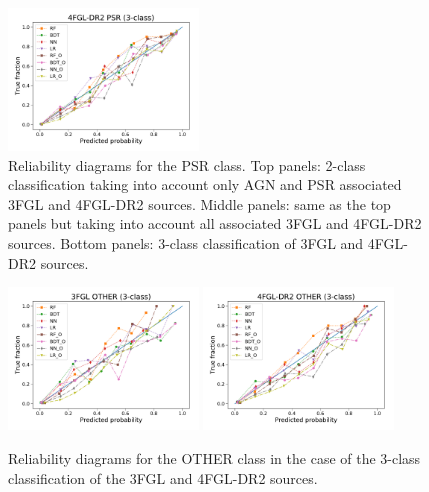 \documentclass{aa}
\begin{document}
\begin{appendix}
\begin{figure}[h!t]
\includegraphics[width=0.45\textwidth]{plots/reliability/calibration_PSR_4FGL-DR2_3classes.pdf}
\caption{Reliability diagrams for the PSR class. Top panels: 2-class classification 
taking into account only AGN and PSR associated 3FGL and 4FGL-DR2 sources.
Middle panels: same as the top panels but taking into account all associated 3FGL and 4FGL-DR2 sources.
Bottom panels: 3-class classification of 3FGL and 4FGL-DR2 sources.
}
\label{fig:rel_PSR}
\end{figure}


\begin{figure}[ht]
\centering
\includegraphics[width=0.45\textwidth]{plots/reliability/calibration_OTHER_3FGL_3classes.pdf}
\includegraphics[width=0.45\textwidth]{plots/reliability/calibration_OTHER_4FGL-DR2_3classes.pdf}
\caption{Reliability diagrams for the OTHER class in the case of the 3-class classification of the 3FGL and 4FGL-DR2 sources.
}
\label{fig:rel_OTHER}
\end{figure}


\end{appendix}
\end{document}
